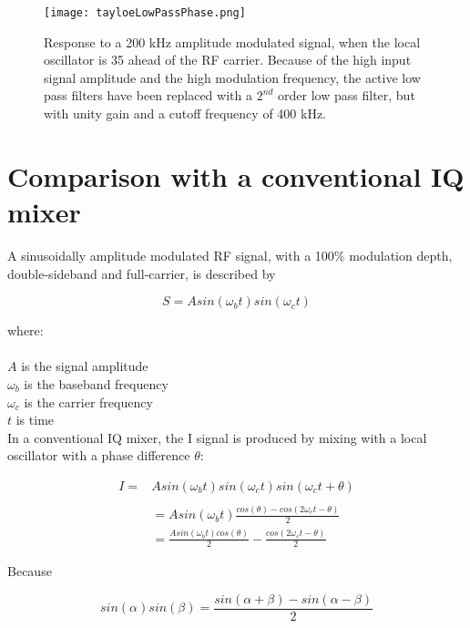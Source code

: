 \documentclass[11pt, twoside]{article}
\begin{document}
\begin{figure}
  \center
    \captionsetup{width=.8\linewidth}
  \texttt{[image: tayloeLowPassPhase.png]}
  \caption{Response to a 200 kHz amplitude modulated signal, when the
    local oscillator is 35{\degree} ahead of the RF carrier. Because
    of the high input signal amplitude and the high modulation
    frequency, the active low pass filters have been replaced with a
    $2^{nd}$ order low pass filter, but with unity gain and a cutoff
    frequency of 400 kHz.}
  \label{figure:tayloelowpassphase}
\end{figure}

\section{Comparison with a conventional IQ mixer}

A sinusoidally amplitude modulated RF signal, with a 100\% modulation
depth, double-sideband and full-carrier, is described by

\begin{equation*}
S = A sin({\omega_b}t) sin({\omega_c}t)
\end{equation*}

where:\\
\\
$A$ is the signal amplitude\\
$\omega_b$ is the baseband frequency\\
$\omega_c$ is the carrier frequency \\
  $t$ is time\\

In a conventional IQ mixer, the I signal is produced by mixing with a
local oscillator with a phase difference $\theta$:

\begin{align*}
I =& A sin({\omega_b}t)  sin({\omega}_ct)sin({\omega}_ct + \theta) \\
\\
&= A sin({\omega_b}t)  \frac{cos(\theta) - cos(2 {\omega}_ct - \theta)}{2}
\\
&= \frac{A sin({\omega_b}t) cos(\theta)}{2} - \frac{cos(2 {\omega_c}t - \theta)}{2}
\end{align*}

Because

\begin{equation*}
  sin(\alpha) sin(\beta) = \frac{sin(\alpha + \beta) - sin(\alpha - \beta)}{2}
\end{equation*}
\end{document}
